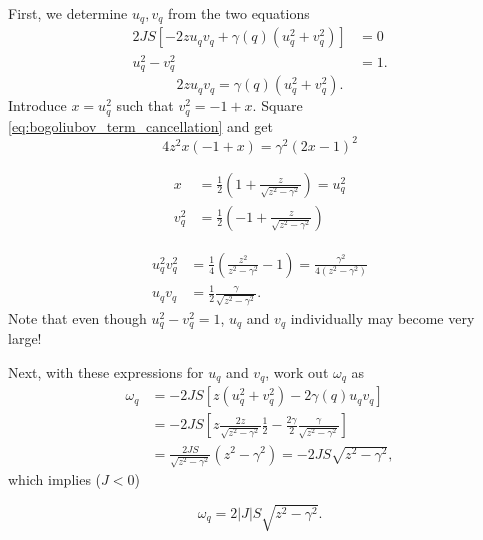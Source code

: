First, we determine $u_{q}, v_{q}$ from the two equations
\begin{align}
	2JS\left [-2zu_{q}v_{q} + \gamma(q)(u_{q}^2  + v_{q}^2)\right ] &= 0 \\
	u_{q}^2 - v_{q}^2 &= 1.
\end{align}
\begin{equation}\label{eq:bogoliubov_term_cancellation}
	2zu_{q}v_{q} = \gamma(q)(u_{q}^2  + v_{q}^2).
\end{equation}
Introduce $x = u_{q}^2$ such that $v_{q}^2 = -1 + x$. Square \cref{eq:bogoliubov_term_cancellation} and get
\begin{equation}
	4z^2x(-1+x) = \gamma^2(2x-1)^2
\end{equation}
\begin{tcolorbox}
	\begin{align}
		x&= \frac{1}{2}\left (1 + \frac{z}{\sqrt{z^2 - \gamma^2}}\right ) = u_q^2 \\
		v_q^2 &= \frac{1}{2}\left (-1 + \frac{z}{\sqrt{z^2-\gamma^2}}\right )
	\end{align}
\end{tcolorbox}
\begin{align*}
	u_{q}^2v_{q}^2 &= \frac{1}{4}\left (\frac{z^2}{z^2-\gamma^2} - 1\right ) = \frac{\gamma^2}{4(z^2-\gamma^2)} \\
	u_{q}v_{q} &= \frac{1}{2}\frac{\gamma}{\sqrt{z^2 - \gamma^2}}.
\end{align*}
Note that even though $u_{q}^2 - v_q^2 = 1$, $u_q$ and $v_q$ individually may become very large!

Next, with these expressions for $u_q$ and $v_q$, work out $\omega_q$ as
\begin{align}
	\omega_q &=-2JS\left [z(u_{q}^2 + v_{q}^2)-2\gamma(q)u_{q}v_{q}\right ]\nonumber\\
	&= -2JS\left [z\frac{2z}{\sqrt{z^2-\gamma^2}}\frac{1}{2} - \frac{2\gamma}{2}\frac{\gamma}{\sqrt{z^2-\gamma^2}}\right ]\nonumber \\
	&= \frac{2JS}{\sqrt{z^2-\gamma^2}}\left (z^2 - \gamma^2\right ) =-2JS\sqrt{z^2-\gamma^2} \nonumber,
\end{align}
which implies ($J<0$)
\begin{tcolorbox}
	\begin{equation}
		\omega_q = 2|J|S\sqrt{z^2-\gamma^2}.
	\end{equation}
\end{tcolorbox}

